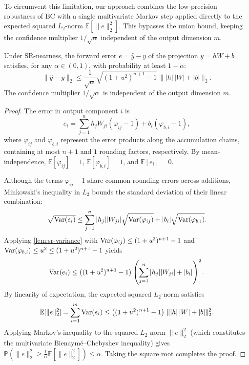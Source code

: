 To circumvent this limitation, our approach combines the low-precision robustness of BC with a single multivariate Markov step applied directly to the expected squared $L_2$-norm $\mathbb{E}[\|e\|_2^2]$. This bypasses the union bound, keeping the confidence multiplier $1/\sqrt{\alpha}$ independent of the output dimension $m$.

\begin{theorem}
  \label{thm:vector-bc}
  Under SR-nearness, the forward error $e = \hat{y} - y$ of the projection $y = h W + b$
  satisfies, for any $\alpha \in (0, 1)$, with probability at least $1 - \alpha$:
  \begin{equation*}
    \|\hat{y} - y\|_2 \le \frac{1}{\sqrt{\alpha}} \sqrt{(1 + u^2)^{n+1} - 1} \, \| |h| \, |W| + |b| \|_2.
  \end{equation*}
  The confidence multiplier $1/\sqrt{\alpha}$ is independent of the output dimension $m$.
\end{theorem}

\begin{proof}
  The error in output component $i$ is
  \begin{equation*}
    e_i = \sum_{j=1}^{n} h_j W_{ji} (\varphi_{ij} - 1) + b_i (\varphi_{b,i} - 1),
  \end{equation*}
  where $\varphi_{ij}$ and $\varphi_{b,i}$ represent the error products along the accumulation
  chains, containing at most $n + 1$ and $1$ rounding factors, respectively. By mean-independence,
  $\mathbb{E}[\varphi_{ij}] = 1$, $\mathbb{E}[\varphi_{b,i}] = 1$, and $\mathbb{E}[e_i] = 0$.

  Although the terms $\varphi_{ij} - 1$ share common rounding errors across additions,
  Minkowski's inequality in $L_2$ bounds the standard deviation of their linear combination:
  \begin{equation*}
    \sqrt{\operatorname{Var}(e_i)} \le \sum_{j=1}^{n} |h_j| |W_{ji}| \sqrt{\operatorname{Var}(\varphi_{ij})} + |b_i| \sqrt{\operatorname{Var}(\varphi_{b,i})}.
  \end{equation*}
  Applying \cref{lem:sr-variance} with $\operatorname{Var}(\varphi_{ij}) \le (1 + u^2)^{n+1} - 1$ and
  $\operatorname{Var}(\varphi_{b,i}) \le u^2 \le (1 + u^2)^{n+1} - 1$ yields
  \begin{equation*}
    \operatorname{Var}(e_i) \le \left( (1 + u^2)^{n+1} - 1 \right) \left( \sum_{j=1}^{n} |h_j| |W_{ji}| + |b_i| \right)^2.
  \end{equation*}
  By linearity of expectation, the expected squared $L_2$-norm satisfies
  \begin{equation*}
    \mathbb{E}[\|e\|_2^2] = \sum_{i=1}^{m} \operatorname{Var}(e_i) \le \left( (1 + u^2)^{n+1} - 1 \right) \, \| |h| \, |W| + |b| \|_2^2.
  \end{equation*}
  Applying Markov's inequality to the squared $L_2$-norm $\|e\|_2^2$ (which constitutes the
  multivariate Bienaym\'e--Chebyshev inequality) gives
  $\mathbb{P}\left( \|e\|_2^2 \ge \frac{1}{\alpha} \mathbb{E}[\|e\|_2^2] \right) \le \alpha$.
  Taking the square root completes the proof.
\end{proof}

